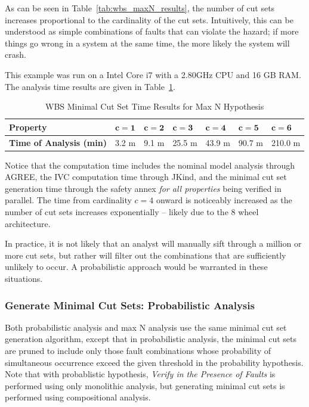 As can be seen in Table~\ref{tab:wbs_maxN_results}, the number of cut sets increases proportional to the cardinality of the cut sets. Intuitively, this can be understood as simple combinations of faults that can violate the hazard; if more things go wrong in a system at the same time, the more likely the system will crash. 

This example was run on a Intel Core i7 with a 2.80GHz CPU and 16 GB RAM. The analysis time results are given in Table~\ref{tab:analysisTimeWBS}. 

\begin{center}
\begin{table}[htbp]
    \begin{tabular}{ | l | l | l | l | l | l | l |}
    \hline
    \textbf{Property} & $\bm{c = 1}$ & $\bm{c = 2}$ & $\bm{c = 3}$ & $\bm{c = 4}$ 
		& $\bm{c = 5}$ & $\bm{c = 6}$   \\ \hline \hline
    \textbf{Time of Analysis (min)} & 3.2 m & 9.1 m & 25.5 m & 43.9 m & 90.7 m & 210.0 m  \\ \hline
    \end{tabular}
    \caption{WBS Minimal Cut Set Time Results for Max N Hypothesis}
    \label{tab:analysisTimeWBS}
\end{table}
\end{center}

Notice that the computation time includes the nominal model analysis through AGREE, the IVC computation time through JKind, and the minimal cut set generation time through the safety annex {\em for all properties} being verified in parallel. The time from cardinality $c = 4$ onward is noticeably increased as the number of cut sets increases exponentially -- likely due to the 8 wheel architecture. 

In practice, it is not likely that an analyst will manually sift through a million or more cut sets, but rather will filter out the combinations that are sufficiently unlikely to occur. A probabilistic approach would be warranted in these situations. 

\subsubsection{Generate Minimal Cut Sets: Probabilistic Analysis}
\label{sec:prob_generate}
Both probabilistic analysis and max N analysis use the same minimal cut set generation algorithm, except that in probabilistic analysis, the minimal cut sets are pruned to include only those fault combinations whose probability of simultaneous occurrence exceed the given threshold in the probability hypothesis. Note that with probablistic hypothesis, \textit{Verify in the Presence of Faults} is performed using only monolithic analysis, but generating minimal cut sets is performed using compositional analysis.

